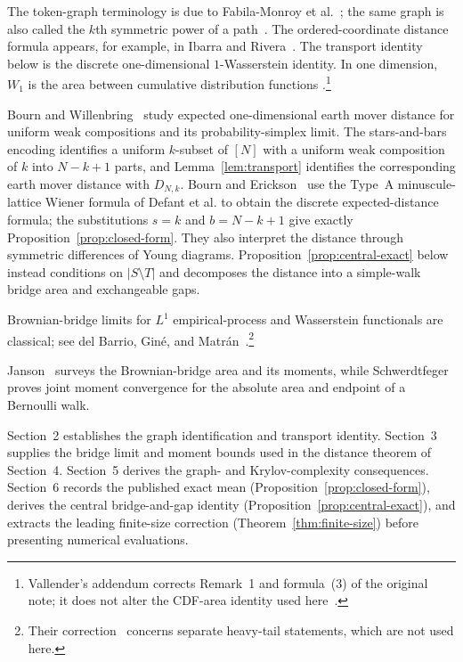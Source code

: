 \documentclass[twoside,10pt]{article}
\numberwithin{equation}{section}
\theoremstyle{slbody}
\theoremstyle{definition}
\theoremstyle{remark}
\newcommand{\1}{\mathbf{1}}
\begin{document}
The token-graph terminology is due to Fabila-Monroy et
al.~\cite{FabilaMonroy}; the same graph is also called the $k$th symmetric power of a
path~\cite{AudenaertEtAl}.  The ordered-coordinate distance formula appears,
for example, in Ibarra and Rivera~\cite[Lemma~5.2]{IbarraRivera}.  The transport
identity below is the discrete one-dimensional $1$-Wasserstein identity.  In
one dimension, $W_1$ is the area between cumulative distribution functions
\cite{Vallender,DeAngelisGray}.\footnote{Vallender's addendum corrects
Remark~1 and formula~(3) of the original note; it does not alter the CDF-area
identity used here~\cite{VallenderAddendum}.}

Bourn and Willenbring~\cite{BournWillenbring} study expected one-dimensional
earth mover distance for uniform weak compositions and its probability-simplex
limit.  The stars-and-bars encoding identifies a uniform $k$-subset of $[N]$
with a uniform
weak composition of $k$ into $N-k+1$ parts, and Lemma~\ref{lem:transport}
identifies the corresponding earth mover distance with $D_{N,k}$.  Bourn and
Erickson~\cite[Theorem~4.3]{BournErickson} use the Type~A minuscule-lattice
Wiener formula of Defant et al. to obtain the discrete expected-distance
formula; the substitutions $s=k$ and $b=N-k+1$ give exactly
Proposition~\ref{prop:closed-form}.  They also interpret the distance through
symmetric differences of Young diagrams.  Proposition~\ref{prop:central-exact}
below instead conditions on $|S\setminus T|$ and decomposes the distance into a
simple-walk bridge area and exchangeable gaps.

Brownian-bridge limits for $L^1$ empirical-process and Wasserstein functionals
are classical; see del
Barrio, Gin\'e, and Matr\'an~\cite{delBarrioGineMatran}.\footnote{Their
correction~\cite{delBarrioCorrection} concerns separate heavy-tail statements,
which are not used here.}

Janson~\cite[Section~20]{Janson} surveys the Brownian-bridge area and its
moments, while Schwerdtfeger~\cite[Section~12.2]{Schwerdtfeger} proves joint
moment convergence for the absolute area and endpoint of a Bernoulli walk.

Section~2 establishes the graph identification and transport identity.
Section~3 supplies the bridge limit and moment bounds used in the distance
theorem of Section~4.  Section~5 derives the graph- and Krylov-complexity
consequences.  Section~6 records the published exact mean
(Proposition~\ref{prop:closed-form}), derives the central bridge-and-gap
identity (Proposition~\ref{prop:central-exact}), and extracts the leading
finite-size correction (Theorem~\ref{thm:finite-size}) before presenting
numerical evaluations.
\end{document}
